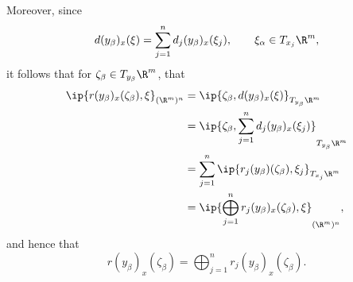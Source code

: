 \begin{comment}
Then after direct-summing over $\alpha$, we conclude that for $(x,\xi)\in T(\R^m)^n$,
{\scriptsize
\begin{align*}
	d(y_\beta)_x(\xi)&=\bigoplus_{\alpha=1}^nd_\alpha(y_\beta)_x(\xi_\alpha)\\
	&=\bigoplus_{\alpha=1}^n\left[\delta_{\alpha\beta}(\sigma^2+\vec{\epsilon})^{\odot-\frac{1}{2}}-\frac{1}{n}(\sigma^2+\vec{\epsilon})^{\odot-\frac{1}{2}}-\frac{1}{n}(\sigma^2+\vec{\epsilon})^{\odot-\frac{3}{2}}\dot(x_\beta-\mu)\odot(x_\alpha-\mu)\right]\odot\xi_\alpha\\
	&=\sum_{j=1}^n\delta_{j\beta}(\sigma^2+\vec{\epsilon})^{\odot-\frac{1}{2}}\odot\xi_j-\frac{1}{n}\sum_{j=1}^n(\sigma^2+\vec{\epsilon})^{\odot-\frac{1}{2}}\odot\xi_j\\
	&\qquad-\frac{1}{n}\sum_{j=1}^n(\sigma^2+\vec{\epsilon})^{\odot-\frac{3}{2}}\odot(x_\beta-\mu)\odot(x_j-\mu)\odot\xi_j\\
	&=(\sigma^2+\vec{\epsilon})^{\odot-\frac{1}{2}}\odot\xi_\beta-\frac{1}{n}(\sigma^2+\vec{\epsilon})^{\odot-\frac{1}{2}}\odot\sum_{j=1}^n\xi_j\\
	&\qquad-\frac{1}{n}(\sigma^2+\vec{\epsilon})^{\odot-1}\odot y_\beta\odot\sum_{j=1}^n(x_j-\mu)\odot\xi_j\\
	&=\theta\odot\xi_\beta-\frac{1}{n}\theta\odot\sum_{j=1}^n\xi_j-\frac{1}{n}\theta^2\odot y_\beta\odot\sum_{j=1}^n(x_j-\mu)\odot\xi_j,
\end{align*}
}
where
$$\theta=(\sigma^2+\vec{\epsilon})^{\odot-\frac{1}{2}},\qquad\theta^2=\theta^{\odot2}.$$

\end{comment}


Moreover, since
$$d(y_\beta)_x(\xi)=\sum_{j=1}^nd_j(y_\beta)_x(\xi_j),\qquad\xi_\alpha\in T_{x_j}\R^m,$$
it follows that for $\zeta_\beta\in T_{y_\beta}\R^m$, that
\begin{align*}
	\ip{r(y_\beta)_x(\zeta_\beta),\xi}_{(\R^m)^n}&=\ip{\zeta_\beta,d(y_\beta)_x(\xi)}_{T_{y_\beta}\R^m}\\
	&=\ip{\zeta_\beta,\sum_{j=1}^nd_j(y_\beta)_x(\xi_j)}_{T_{y_\beta}\R^m}\\
	&=\sum_{j=1}^n\ip{r_j(y_\beta)(\zeta_\beta),\xi_j}_{T_{x_j}\R^m}\\
	&=\ip{\bigoplus_{j=1}^nr_j(y_\beta)_x(\zeta_\beta),\xi}_{(\R^m)^n},
\end{align*}
and hence that
$$r(y_\beta)_x(\zeta_\beta)=\bigoplus_{j=1}^nr_j(y_\beta)_x(\zeta_\beta).$$

